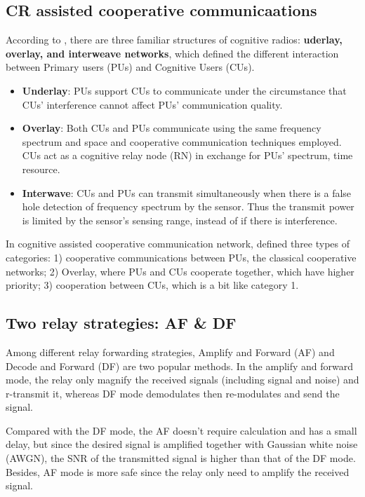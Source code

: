 \documentclass[journal]{IEEEtran}
\begin{document}
\subsection{CR assisted cooperative communicaations}
According to \cite{liang2013cooperative}, there are three familiar structures of cognitive radios: \textbf{uderlay, overlay, and interweave networks}, which defined the different interaction between Primary users (PUs) and Cognitive Users (CUs).
\begin{itemize}
  \item \textbf{Underlay}: PUs support CUs to communicate under the circumstance that CUs' interference cannot affect PUs' communication quality.
  \item \textbf{Overlay}: Both CUs and PUs communicate using the same frequency spectrum and space and cooperative communication techniques employed. CUs act as a cognitive relay node (RN) in exchange for PUs' spectrum, time resource.
  \item \textbf{Interwave}: CUs and PUs can transmit simultaneously when there is a false hole detection of frequency spectrum by the sensor. Thus the transmit power is limited by the sensor's sensing range, instead of if there is interference.
\end{itemize}
In cognitive assisted cooperative communication network, \cite{liang2013cooperative} defined three types of categories: 1) cooperative communications between PUs, the classical cooperative networks; 2) Overlay, where PUs and CUs cooperate together, which have higher priority; 3) cooperation between CUs, which is a bit like category 1.


\subsection{Two relay strategies: AF \& DF}


Among different relay forwarding strategies, Amplify and Forward (AF) and Decode and Forward (DF) are two popular methods. In the amplify and forward mode, the relay only magnify the received signals (including signal and noise) and r-transmit it, whereas DF mode demodulates then re-modulates and send the signal.


Compared with the DF mode, the AF doesn't require calculation and has a small delay, but since the desired signal is amplified together with Gaussian white noise (AWGN), the SNR of the transmitted signal is higher than that of the DF mode. Besides, AF mode is more safe since the relay only need to amplify the received signal.
\end{document}

